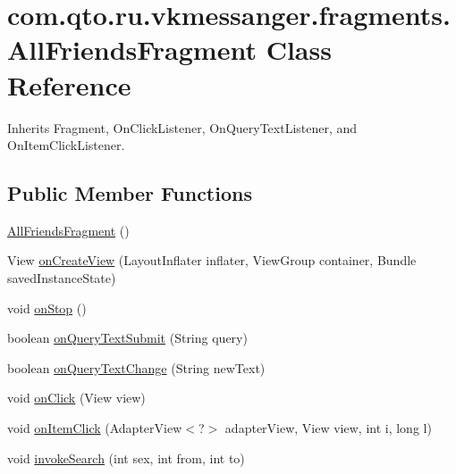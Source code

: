 \hypertarget{classcom_1_1qto_1_1ru_1_1vkmessanger_1_1fragments_1_1_all_friends_fragment}{}\section{com.\+qto.\+ru.\+vkmessanger.\+fragments.\+All\+Friends\+Fragment Class Reference}
\label{classcom_1_1qto_1_1ru_1_1vkmessanger_1_1fragments_1_1_all_friends_fragment}


Inherits Fragment, On\+Click\+Listener, On\+Query\+Text\+Listener, and On\+Item\+Click\+Listener.

\subsection*{Public Member Functions}
\begin{DoxyCompactItemize}
\item 
\hyperlink{classcom_1_1qto_1_1ru_1_1vkmessanger_1_1fragments_1_1_all_friends_fragment_aa8d3b1db86f7ed5f4c568f27133ed267}{All\+Friends\+Fragment} ()
\item 
View \hyperlink{classcom_1_1qto_1_1ru_1_1vkmessanger_1_1fragments_1_1_all_friends_fragment_aca4d2e320405620b79db5da20a72a658}{on\+Create\+View} (Layout\+Inflater inflater, View\+Group container, Bundle saved\+Instance\+State)
\item 
void \hyperlink{classcom_1_1qto_1_1ru_1_1vkmessanger_1_1fragments_1_1_all_friends_fragment_af28c1d3820ac96021feeec94ea62c0c1}{on\+Stop} ()
\item 
boolean \hyperlink{classcom_1_1qto_1_1ru_1_1vkmessanger_1_1fragments_1_1_all_friends_fragment_a2c781e0950cea95bb950c8fd3fce7acf}{on\+Query\+Text\+Submit} (String query)
\item 
boolean \hyperlink{classcom_1_1qto_1_1ru_1_1vkmessanger_1_1fragments_1_1_all_friends_fragment_a621d69b5435f365d9651c9de31b5822e}{on\+Query\+Text\+Change} (String new\+Text)
\item 
void \hyperlink{classcom_1_1qto_1_1ru_1_1vkmessanger_1_1fragments_1_1_all_friends_fragment_aa2833500012dbddd51f2a03cb2054430}{on\+Click} (View view)
\item 
void \hyperlink{classcom_1_1qto_1_1ru_1_1vkmessanger_1_1fragments_1_1_all_friends_fragment_acc23fac57d04de8ea99e27e27543b4f5}{on\+Item\+Click} (Adapter\+View$<$?$>$ adapter\+View, View view, int i, long l)
\item 
void \hyperlink{classcom_1_1qto_1_1ru_1_1vkmessanger_1_1fragments_1_1_all_friends_fragment_a2e3a991303f6e3ff21cd8468c5fe375c}{invoke\+Search} (int sex, int from, int to)
\end{DoxyCompactItemize}


